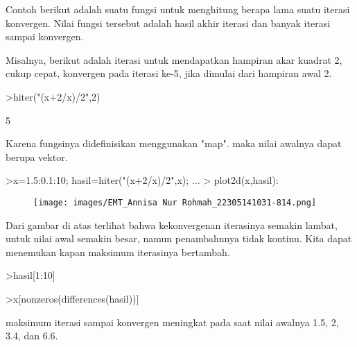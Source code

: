 \documentclass[a4paper,10pt]{article}
\begin{document}
\begin{eulernotebook}
\begin{eulercomment}
Contoh berikut adalah suatu fungsi untuk menghitung berapa lama suatu
iterasi konvergen. Nilai fungsi tersebut adalah hasil akhir iterasi
dan banyak iterasi sampai konvergen.
\end{eulercomment}
\begin{eulercomment}
Misalnya, berikut adalah iterasi untuk mendapatkan hampiran akar
kuadrat 2, cukup cepat, konvergen pada iterasi ke-5, jika dimulai dari
hampiran awal 2.
\end{eulercomment}
\begin{eulerprompt}
>hiter("(x+2/x)/2",2)
\end{eulerprompt}
\begin{euleroutput}
  5
\end{euleroutput}
\begin{eulercomment}
Karena fungsinya didefinisikan menggunakan "map". maka nilai awalnya
dapat berupa vektor.
\end{eulercomment}
\begin{eulerprompt}
>x=1.5:0.1:10; hasil=hiter("(x+2/x)/2",x); ...
>  plot2d(x,hasil):
\end{eulerprompt}
\begin{figure}[h]
    \centering
    \texttt{[image: images/EMT\_Annisa Nur Rohmah\_22305141031-814.png]}
\end{figure}
\begin{eulercomment}
Dari gambar di atas terlihat bahwa kekonvergenan iterasinya semakin
lambat, untuk nilai awal semakin besar, namun penambahnnya tidak
kontinu. Kita dapat menemukan kapan maksimum iterasinya bertambah.
\end{eulercomment}
\begin{eulerprompt}
>hasil[1:10]
\end{eulerprompt}
\begin{euleroutput}
  [4,  5,  5,  5,  5,  5,  6,  6,  6,  6]
\end{euleroutput}
\begin{eulerprompt}
>x[nonzeros(differences(hasil))]
\end{eulerprompt}
\begin{euleroutput}
  [1.5,  2,  3.4,  6.6]
\end{euleroutput}
\begin{eulercomment}
maksimum iterasi sampai konvergen meningkat pada saat nilai awalnya
1.5, 2, 3.4, dan 6.6.


\end{eulercomment}
\end{eulernotebook}
\end{document}
